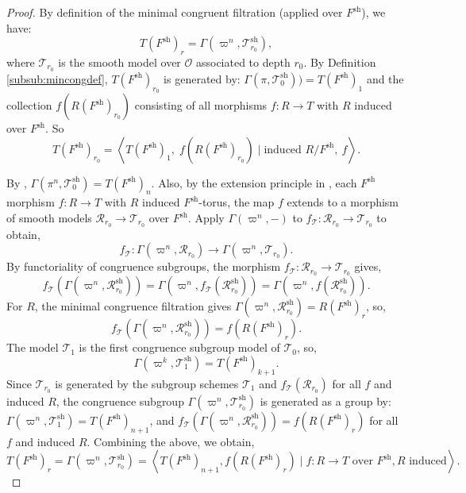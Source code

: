 \documentclass[american]{article}
\numberwithin{equation}{section}
\numberwithin{figure}{section}
\theoremstyle{plain}
\theoremstyle{definition}
\theoremstyle{remark}
\DeclareMathOperator{\sh}{sh}
\begin{document}
\begin{proof}
By definition of the minimal congruent filtration (applied over \(F^{\mathrm{sh}}\)), we have:
\[
T(F^{\mathrm{sh}})_r = \Gamma(\varpi^n, \mathscr{T}_{r_0}^{\mathrm{sh}}),
\]
where \(\mathscr{T}_{r_0}\) is the smooth model over \(\mathcal{O}\) associated to depth \(r_0\).
By Definition \ref{subsub:mincongdef}, \(T(F^{\mathrm{sh}})_{r_0}\) is generated by:
 \(\Gamma(\pi, \mathscr{T}_0^{\mathrm{sh}})) = T(F^{\mathrm{sh}})_1\) and the collection
\(f(R(F^{\mathrm{sh}})_{r_0})\) consisting of all morphisms \(f \colon R \to T\) with \(R\) induced over \(F^{\sh}\).
So
\[
T(F^{\mathrm{sh}})_{r_0} = \left\langle T(F^{\mathrm{sh}})_1,\; f(R(F^{\mathrm{sh}})_{r_0}) \mid \text{induced } R/F^{\sh},\ f \right\rangle.
\]

By \cite[Proposition 2.8]{yu2002smooth}, \(\Gamma(\pi^n, \mathscr{T}_0^{\mathrm{sh}}) = T(F^{\mathrm{sh}})_{n}\). Also, by the extension principle in \cite[\S 2.3]{yu2002smooth}, each $F^{\sh}$ morphism \(f \colon R \to T\) with \(R\) induced $F^{\sh}$-torus, the map \(f\) extends to a morphism of smooth models \(\mathscr{R}_{r_0} \to \mathscr{T}_{r_0}\) over $F^{\sh}$. Apply \(\Gamma(\varpi^n, -)\) to \(f_{\mathscr{T}}: \mathscr{R}_{r_0} \to \mathscr{T}_{r_0}\) to obtain,
  \[
  f_{\mathscr{T}}: \Gamma(\varpi^n, \mathscr{R}_{r_0}) \longrightarrow \Gamma(\varpi^n, \mathscr{T}_{r_0}).
  \]
By functoriality of congruence subgroups, the morphism \(f_{\mathscr{T}}: \mathscr{R}_{r_0} \to \mathscr{T}_{r_0}\) gives,  
\[
f_{\mathscr{T}}\left(\Gamma(\varpi^n, \mathscr{R}_{r_0}^{\text{sh}})\right) = \Gamma\left(\varpi^n, f_{\mathscr{T}}(\mathscr{R}_{r_0}^{\text{sh}})\right) = \Gamma\left(\varpi^n, f(\mathscr{R}_{r_0}^{\text{sh}})\right).
\]
For \(R\), the minimal congruence filtration gives \(\Gamma(\varpi^n, \mathscr{R}_{r_0}^{\text{sh}}) = R(F^{\text{sh}})_r\), so,
\[
f_{\mathscr{T}}(\Gamma(\varpi^n, \mathscr{R}_{r_0}^{\text{sh}})) = f(R(F^{\text{sh}})_r).
\]
The model \(\mathscr{T}_1\) is the first congruence subgroup model of \(\mathscr{T}_0\), so,
\[
\Gamma(\varpi^k, \mathscr{T}_1^{\text{sh}}) = T(F^{\text{sh}})_{k+1}.
\]
Since \(\mathscr{T}_{r_0}\) is generated by the subgroup schemes \(\mathscr{T}_1\) and \(f_{\mathscr{T}}(\mathscr{R}_{r_0})\) for all \(f\) and induced \(R\), the congruence subgroup \(\Gamma(\varpi^n, \mathscr{T}_{r_0}^{\text{sh}})\) is generated as a group by:
 \(\Gamma(\varpi^n, \mathscr{T}_1^{\text{sh}}) = T(F^{\text{sh}})_{n+1}\),
and \(f_{\mathscr{T}}(\Gamma(\varpi^n, \mathscr{R}_{r_0}^{\text{sh}})) = f(R(F^{\text{sh}})_r)\) for all \(f\) and induced \(R\).
Combining the above, we obtain,
\[
T(F^{\text{sh}})_r = \Gamma(\varpi^n, \mathscr{T}_{r_0}^{\text{sh}}) = \left\langle T(F^{\text{sh}})_{n+1}, f(R(F^{\text{sh}})_r) \mid f: R \to T \text{ over } F^{\text{sh}}, R \text{ induced} \right\rangle.
\]
\end{proof}
\end{document}
